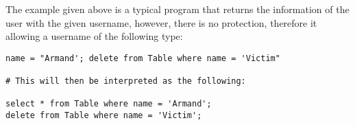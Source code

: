 The example given above is a typical program that returns the information of the user with the given username, however, there is no protection, therefore it allowing a username of the following type:

\begin{lstlisting}[caption = SQL Injection, columns=fixed, basewidth=0.5em, basicstyle={\ttfamily}, frame=single]
name = "Armand'; delete from Table where name = 'Victim"

# This will then be interpreted as the following:

select * from Table where name = 'Armand';
delete from Table where name = 'Victim';

\end{lstlisting}
